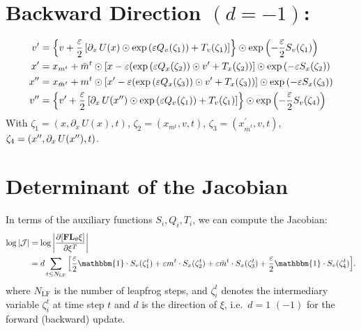\documentclass[../main.tex]{subfiles}
\begin{document}
\section{Backward Direction \texorpdfstring{$(d = -1)$}{(d = -1)}:}%
\label{sec:lf_backward}
%
\begin{align}
  v^{\prime} &= {\left\{v + \frac{\eps}{2}\left[\partial_{x}\,U(x)\odot
        \exp{\left(\eps Q_{v}(\zeta_{1})\right)}%
    + T_{v}(\zeta_{1})\right]\right\}} \odot
    \exp{\left(-\frac{\eps}{2}S_{v}(\zeta_{1})\right)} \\
  \xp &= x_{m^{t}} + \bar{m}^{t}\odot%
    {\left[x - \eps{\left(\exp{\left(\eps Q_{x}(\zeta_{2})\right)}\odot \vp%
    + T_{x}(\zeta_{2})\right)}\right]}\odot \exp{\left(-\eps
    S_{x}(\zeta_{2})\right)} \\ 
  \xpp &= x_{\bar{m}^{t}} + m^{t}\odot%
    {\left[\xp - \eps{\left(\exp{\left(\eps Q_{x}(\zeta_{3})\right)}\odot \vp%
    + T_{x}(\zeta_{3})\right)}\right]}\odot \exp{\left(-\eps
    S_{x}(\zeta_{3})\right)} \\
  v^{\prime\prime} &= {\left\{\vp +
      \frac{\eps}{2}\left[\partial_{x}\,U(\xpp)\odot%
        \exp{\left(\eps Q_{v}(\zeta_{1})\right)}
  + T_{v}(\zeta_{1})\right]\right\}}\odot 
    \exp{\left(-\frac{\eps}{2}S_{v}(\zeta_{4})\right)}
\end{align}
%
With $\zeta_{1} = (x, \partial_{x}\, U(x), t)$, $\zeta_{2} = (x_{m^{t}}, v,
t)$, $\zeta_{3} = (x^{\prime}_{\bar{m}^{t}}, v, t)$, $\zeta_{4} = ({x^{\prime\prime}},
\partial_{x}\, U({x^{\prime\prime}}), t)$.
%
\section{Determinant of the Jacobian}
In terms of the auxiliary functions $S_{i}, Q_{i}, T_{i}$, we can compute the
Jacobian:
%
\begin{align}
  \log|\mathcal{J}| 
  &= \log\bigg|\frac{\partial{\left[\mathbf{FL}_{\theta}\xi\right]}}{\partial
  \xi^{T}}\bigg|\\
  &= d \sum_{t\leq N_{\mathrm{LF}}}
    {\left[\frac{\eps}{2} \mathbbm{1}\cdot S_{v}(\zeta_{1}^{t}) + \eps m^{t}
        \cdot S_{x}(\zeta_{2}^{t}) 
      + \eps \bar{m}^{t} \cdot S_{x}(\zeta_{3}^{t}) + \frac{\eps}{2}\mathbbm{1}
\cdot S_{v}(\zeta_{4}^{t})\right]}.  \end{align}
%
where $N_{\mathrm{LF}}$ is the number of leapfrog steps, and $\zeta_{i}^{t}$
denotes the intermediary variable $\zeta_{i}^{t}$ at time step $t$ and $d$ is
the direction of $\xi$, i.e.\ $d = 1 \,\, (-1)$ for the forward (backward)
update.
%
\end{document}
